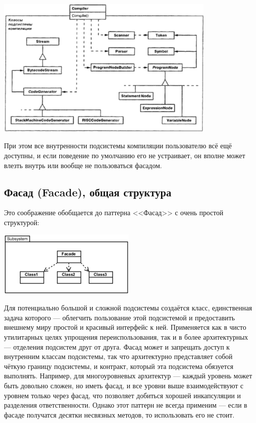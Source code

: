 \documentclass{../mcstext}
\begin{document}
\begin{center}
    \includegraphics[width=0.8\textwidth]{facadeMotivation.png}
\end{center}

При этом все внутренности подсистемы компиляции пользователю всё ещё доступны, и если поведение по умолчанию его не устраивает, он вполне может влезть внутрь или вообще не пользоваться фасадом.

\subsection{Фасад (Facade), общая структура}

Это соображение обобщается до паттерна <<Фасад>> с очень простой структурой:

\begin{center}
    \includegraphics[width=0.5\textwidth]{facade.png}
\end{center}

Для потенциально большой и сложной подсистемы создаётся класс, единственная задача которого --- облегчить пользование этой подсистемой и предоставить внешнему миру простой и красивый интерфейс к ней. Применяется как в чисто утилитарных целях упрощения переиспользования, так и в более архитектурных --- отделения подсистем друг от друга. Фасад может и запрещать доступ к внутренним классам подсистемы, так что архитектурно представляет собой чёткую границу подсистемы, и контракт, который эта подсистема обязуется выполнять. Например, для многоуровневых архитектур --- каждый уровень может быть довольно сложен, но иметь фасад, и все уровни выше взаимодействуют с уровнем только через фасад, что позволяет добиться хорошей инкапсуляции и разделения ответственности. Однако этот паттерн не всегда применим --- если в фасаде получатся десятки несвязных методов, то использовать его не стоит.
\end{document}
